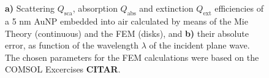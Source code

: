 \begin{figure}[h!]
\def\svgwidth{\textwidth} \small
\hspace*{-1.25em}
\begin{subfigure}{.1\textwidth}\caption{ }\label{fig:Eff:sphere:First:a}\end{subfigure}
\vspace*{12.5em} %
\\
\vspace*{-16.5em} %
\hspace*{-.75em}%
\begin{subfigure}{.1\textwidth}\caption{ }\label{fig:Eff:sphere:First:b}\end{subfigure}\\
\vspace*{-1.5em} %
\caption[Scattering, Absorption and Extinction Efficiencies of a 5 nm AuNP$@$Air: Analytical and FEM solutions with no optimizatio]{\textbf{a)} Scattering $Q_\text{sca}$, absorption $Q_\text{abs}$ and extinction $Q_\text{ext}$ efficiencies of a 5 nm AuNP embedded into air calculated by means of the Mie Theory (continuous) and the FEM (disks), and \textbf{b)} their absolute error, as function of the wavelength $\lambda$ of the incident plane wave. The chosen parameters for the FEM calculations were based on the COMSOL Excercises \textbf{CITAR}.}
\label{fig:Eff:sphere:First}
\end{figure}
